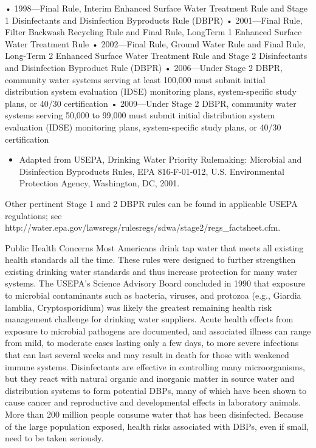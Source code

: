 \documentclass{article}
\begin{document}
• 1998---Final Rule, Interim Enhanced Surface Water Treatment Rule and
Stage 1 Disinfectants and Disinfection Byproducts Rule (DBPR) •
2001---Final Rule, Filter Backwash Recycling Rule and Final Rule,
LongTerm 1 Enhanced Surface Water Treatment Rule • 2002---Final Rule,
Ground Water Rule and Final Rule, Long-Term 2 Enhanced Surface Water
Treatment Rule and Stage 2 Disinfectants and Disinfection Byproduct Rule
(DBPR) • 2006---Under Stage 2 DBPR, community water systems serving at
least 100,000 must submit initial distribution system evaluation (IDSE)
monitoring plans, system-specific study plans, or 40/30 certification •
2009---Under Stage 2 DBPR, community water systems serving 50,000 to
99,000 must submit initial distribution system evaluation (IDSE)
monitoring plans, system-specific study plans, or 40/30 certification

\begin{itemize}
\item
  Adapted from USEPA, Drinking Water Priority Rulemaking: Microbial and
  Disinfection Byproducts Rules, EPA 816-F-01-012, U.S. Environmental
  Protection Agency, Washington, DC, 2001.
\end{itemize}

Other pertinent Stage 1 and 2 DBPR rules can be found in applicable
USEPA regulations; see
http://water.epa.gov/lawsregs/rulesregs/sdwa/stage2/regs\_factsheet.cfm.

Public Health Concerns Most Americans drink tap water that meets all
existing health standards all the time. These rules were designed to
further strengthen existing drinking water standards and thus increase
protection for many water systems. The USEPA's Science Advisory Board
concluded in 1990 that exposure to microbial contaminants such as
bacteria, viruses, and protozoa (e.g., Giardia lamblia, Cryptosporidium)
was likely the greatest remaining health risk management challenge for
drinking water suppliers. Acute health effects from exposure to
microbial pathogens are documented, and associated illness can range
from mild, to moderate cases lasting only a few days, to more severe
infections that can last several weeks and may result in death for those
with weakened immune systems. Disinfectants are effective in controlling
many microorganisms, but they react with natural organic and inorganic
matter in source water and distribution systems to form potential DBPs,
many of which have been shown to cause cancer and reproductive and
developmental effects in laboratory animals. More than 200 million
people consume water that has been disinfected. Because of the large
population exposed, health risks associated with DBPs, even if small,
need to be taken seriously.
\end{document}

